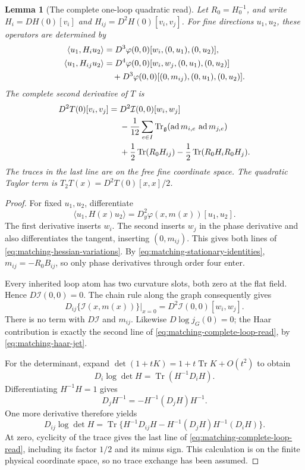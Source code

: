 \documentclass[11pt,reqno]{amsart}
\numberwithin{equation}{section}
\newtheorem{lemma}[theorem]{Lemma}
\theoremstyle{definition}
\theoremstyle{remark}
\newcommand{\g}{\mathfrak g}
\DeclareMathOperator{\ad}{ad}
\begin{document}
\begin{lemma}[The complete one-loop quadratic read]
\label{lem:matching-one-loop-jet}
Let \(R_0=H_0^{-1}\), and write
\(H_i=DH(0)[v_i]\) and
\(H_{ij}=D^2H(0)[v_i,v_j]\).
For fine directions \(u_1,u_2\), these operators are
determined by
\begin{align}
 \langle u_1,H_i u_2\rangle
  &=D^3\varphi(0,0)[w_i,(0,u_1),(0,u_2)],\notag\\
 \langle u_1,H_{ij}u_2\rangle
  &=D^4\varphi(0,0)[w_i,w_j,(0,u_1),(0,u_2)]\notag\\
  &\quad+D^3\varphi(0,0)
                    [(0,m_{ij}),(0,u_1),(0,u_2)].
 \label{eq:matching-hessian-variations}
\end{align}
The complete second derivative of \(T\) is
\begin{align}
 D^2T(0)[v_i,v_j]
   ={}&D^2\mathcal I(0,0)[w_i,w_j]\notag\\
      &-\frac1{12}\sum_{e\in I}
           \operatorname{Tr}_{\g}(\ad m_{i,e}\,\ad m_{j,e})
                                                        \notag\\
      &+\frac12\operatorname{Tr}(R_0H_{ij})
          -\frac12\operatorname{Tr}
                            (R_0H_iR_0H_j).
 \label{eq:matching-complete-loop-read}
\end{align}
The traces in the last line are on the free fine
coordinate space. The quadratic Taylor term is
\(T_2T(x)=D^2T(0)[x,x]/2\).
\end{lemma}
\begin{proof}
For fixed \(u_1,u_2\), differentiate
\[
 \langle u_1,H(x)u_2\rangle
   =D_y^2\varphi(x,m(x))[u_1,u_2].
\]
The first derivative inserts \(w_i\).
The second inserts \(w_j\) in the phase derivative and
also differentiates the tangent, inserting
\((0,m_{ij})\). This gives both lines of
\eqref{eq:matching-hessian-variations}.
By \eqref{eq:matching-stationary-identities},
\(m_{ij}=-R_0B_{ij}\), so only phase derivatives
through order four enter.

Every inherited loop atom has two curvature slots,
both zero at the flat field. Hence \(D\mathcal I(0,0)=0\).
The chain rule along the graph consequently gives
\[
 D_{ij}\{\mathcal I(x,m(x))\}\big|_{x=0}
                         =D^2\mathcal I(0,0)[w_i,w_j].
\]
There is no term with \(D\mathcal I\) and
\(m_{ij}\). Likewise \(D\log j_G(0)=0\);
the Haar contribution is exactly the second line of
\eqref{eq:matching-complete-loop-read}, by
\eqref{eq:matching-haar-jet}.

For the determinant, expand
\(\det(1+tK)=1+t\operatorname{Tr}K+O(t^2)\)
to obtain
\[
 D_i\log\det H
                 =\operatorname{Tr}(H^{-1}D_iH).
\]
Differentiating \(H^{-1}H=1\) gives
\[
 D_jH^{-1}
            =-H^{-1}(D_jH)H^{-1}.
\]
One more derivative therefore yields
\[
 D_{ij}\log\det H
   =\operatorname{Tr}\{
       H^{-1}D_{ij}H
       -H^{-1}(D_jH)
                  H^{-1}(D_iH)\}.
\]
At zero, cyclicity of the trace gives the last line
of \eqref{eq:matching-complete-loop-read}, including
its factor \(1/2\) and its minus sign. This calculation
is on the finite physical coordinate space, so no
trace exchange has been assumed.
\end{proof}
\end{document}
